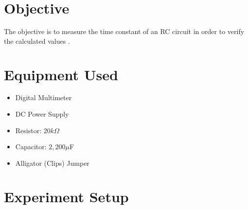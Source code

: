 \documentclass[a4paper]{article}
\begin{document}
\section{Objective}
The objective is to measure the time constant of an RC circuit in order to verify the calculated values \cite{UNCC-ECE-Dept:2023}.
\section{Equipment Used}

\begin{itemize}
    \item Digital Multimeter
    \item DC Power Supply
    \item Resistor: $20k\Omega$
    \item Capacitor: $2,200 \mu$F
    \item Alligator (Clips) Jumper
\end{itemize}

\section{Experiment Setup}
\end{document}
